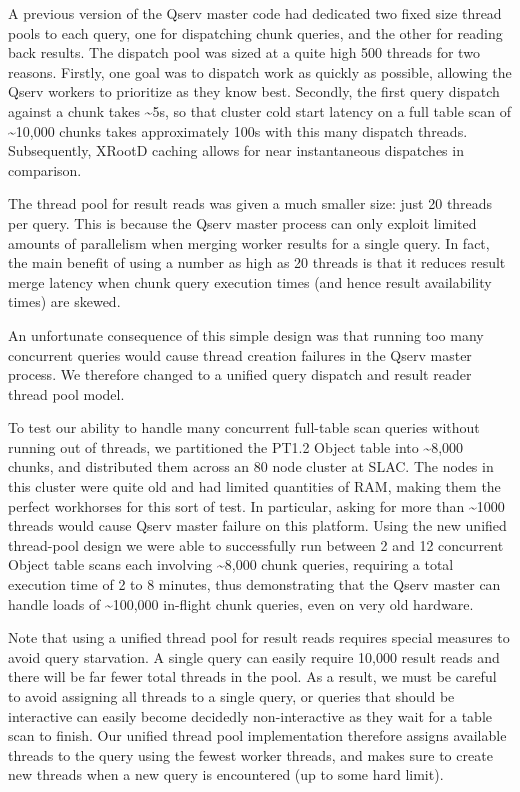 \documentclass[DM,lsstdraft,toc]{lsstdoc}
\begin{document}
A previous version of the Qserv master code had dedicated two fixed size
thread pools to each query, one for dispatching chunk queries, and the
other for reading back results. The dispatch pool was sized at a quite
high 500 threads for two reasons. Firstly, one goal was to dispatch work
as quickly as possible, allowing the Qserv workers to prioritize as they
know best. Secondly, the first query dispatch against a chunk takes
\textasciitilde{}5s, so that cluster cold start latency on a full table
scan of \textasciitilde{}10,000 chunks takes approximately 100s with
this many dispatch threads. Subsequently,
XRootD caching allows for near instantaneous
dispatches in comparison.

The thread pool for result reads was given a much smaller size: just 20
threads per query. This is because the Qserv master process can only
exploit limited amounts of parallelism when merging worker results for a
single query. In fact, the main benefit of using a number as high as 20
threads is that it reduces result merge latency when chunk query
execution times (and hence result availability times) are skewed.

An unfortunate consequence of this simple design was that running too
many concurrent queries would cause thread creation failures in the
Qserv master process. We therefore changed to a unified query dispatch
and result reader thread pool model.

To test our ability to handle many concurrent full-table scan queries
without running out of threads, we partitioned the PT1.2 Object table
into \textasciitilde{}8,000 chunks, and distributed them across an 80
node cluster at SLAC. The nodes in this cluster were quite old and had
limited quantities of RAM, making them the perfect workhorses for this
sort of test. In particular, asking for more than \textasciitilde{}1000
threads would cause Qserv master failure on this platform. Using the new
unified thread-pool design we were able to successfully run between 2
and 12 concurrent Object table scans each involving
\textasciitilde{}8,000 chunk queries, requiring a total execution time
of 2 to 8 minutes, thus demonstrating that the Qserv master can handle
loads of \textasciitilde{}100,000 in-flight chunk queries, even on very
old hardware.

Note that using a unified thread pool for result reads requires special
measures to avoid query starvation. A single query can easily require
10,000 result reads and there will be far fewer total threads in the
pool. As a result, we must be careful to avoid assigning all threads to
a single query, or queries that should be interactive can easily become
decidedly non-interactive as they wait for a table scan to finish. Our
unified thread pool implementation therefore assigns available threads
to the query using the fewest worker threads, and makes sure to create
new threads when a new query is encountered (up to some hard limit).
\end{document}
